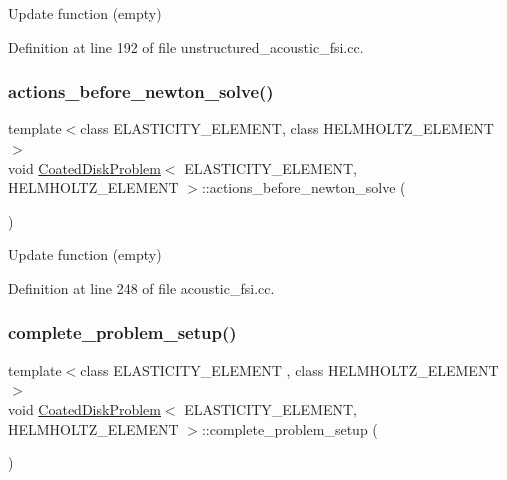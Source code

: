 Update function (empty) 



Definition at line 192 of file unstructured\+\_\+acoustic\+\_\+fsi.\+cc.

\mbox{\label{classCoatedDiskProblem_a3b94aaddee6a8f386ba249f418813963}} 
\subsubsection{\texorpdfstring{actions\+\_\+before\+\_\+newton\+\_\+solve()}{actions\_before\_newton\_solve()}\hspace{0.1cm}{\footnotesize\ttfamily [2/2]}}
{\footnotesize\ttfamily template$<$class E\+L\+A\+S\+T\+I\+C\+I\+T\+Y\+\_\+\+E\+L\+E\+M\+E\+NT, class H\+E\+L\+M\+H\+O\+L\+T\+Z\+\_\+\+E\+L\+E\+M\+E\+NT$>$ \\
void \hyperlink{classCoatedDiskProblem}{Coated\+Disk\+Problem}$<$ E\+L\+A\+S\+T\+I\+C\+I\+T\+Y\+\_\+\+E\+L\+E\+M\+E\+NT, H\+E\+L\+M\+H\+O\+L\+T\+Z\+\_\+\+E\+L\+E\+M\+E\+NT $>$\+::actions\+\_\+before\+\_\+newton\+\_\+solve (\begin{DoxyParamCaption}{ }\end{DoxyParamCaption})\hspace{0.3cm}{\ttfamily [inline]}}



Update function (empty) 



Definition at line 248 of file acoustic\+\_\+fsi.\+cc.

\mbox{\label{classCoatedDiskProblem_a4d63252d3916bda71f28b637d6590627}} 
\subsubsection{\texorpdfstring{complete\+\_\+problem\+\_\+setup()}{complete\_problem\_setup()}}
{\footnotesize\ttfamily template$<$class E\+L\+A\+S\+T\+I\+C\+I\+T\+Y\+\_\+\+E\+L\+E\+M\+E\+NT , class H\+E\+L\+M\+H\+O\+L\+T\+Z\+\_\+\+E\+L\+E\+M\+E\+NT $>$ \\
void \hyperlink{classCoatedDiskProblem}{Coated\+Disk\+Problem}$<$ E\+L\+A\+S\+T\+I\+C\+I\+T\+Y\+\_\+\+E\+L\+E\+M\+E\+NT, H\+E\+L\+M\+H\+O\+L\+T\+Z\+\_\+\+E\+L\+E\+M\+E\+NT $>$\+::complete\+\_\+problem\+\_\+setup (\begin{DoxyParamCaption}{ }\end{DoxyParamCaption})\hspace{0.3cm}{\ttfamily [private]}}

